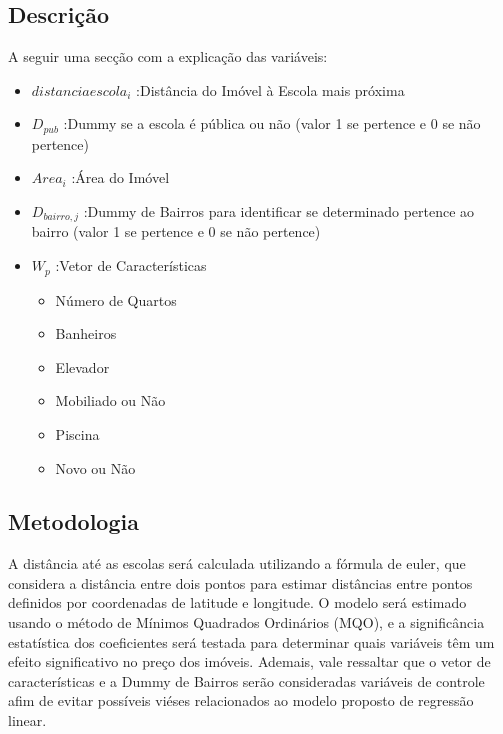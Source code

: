 \subsection{Descrição}
    A seguir uma secção com a explicação das variáveis:
    \begin{itemize}
        \item $distanciaescola_{i}$ :Distância do Imóvel à Escola mais próxima
        \item $D_{pub}$             :Dummy se a escola é pública ou não (valor 1 se pertence e 0 se não pertence)
        \item $Area_{i}$            :Área do Imóvel
        \item $D_{bairro,j}$        :Dummy de Bairros para identificar se determinado pertence ao bairro (valor 1 se pertence e 0 se não pertence)
        \item $W_{p}$               :Vetor de Características
            \begin{itemize}
                \item Número de Quartos
                \item Banheiros 
                \item Elevador
                \item Mobiliado ou Não
                \item Piscina
                \item Novo ou Não
         
            \end{itemize}
            
    \end{itemize}


\subsection{Metodologia}

A distância até as escolas será calculada utilizando a fórmula de euler, que considera a distância entre dois pontos para estimar distâncias entre pontos definidos por coordenadas de latitude e longitude. O modelo será estimado usando o método de Mínimos Quadrados Ordinários (MQO), e a significância estatística dos coeficientes será testada para determinar quais variáveis têm um efeito significativo no preço dos imóveis. Ademais, vale ressaltar que o vetor de características e a Dummy de Bairros serão consideradas variáveis de controle afim de evitar possíveis viéses relacionados ao modelo proposto de regressão linear.

